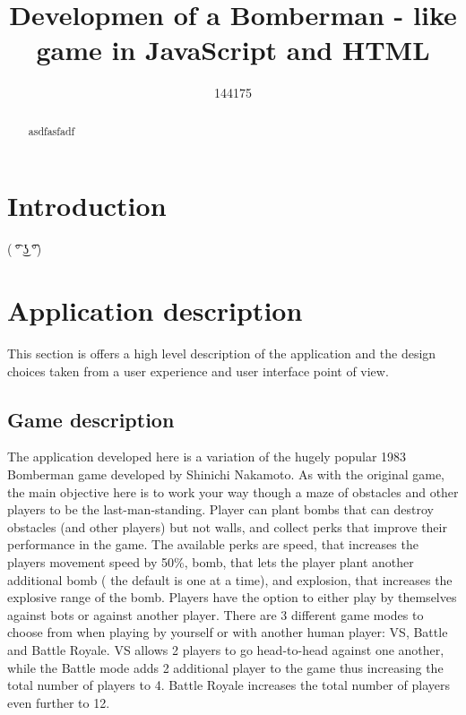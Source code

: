\documentclass[]{article}
\title{Developmen of a Bomberman - like game in JavaScript and HTML}
\author{144175}
\begin{document}
\maketitle

\begin{abstract}
asdfasfadf
\end{abstract}

\section{Introduction}
( ͡° ͜ʖ ͡°)
\section{Application description}
This section is offers a high level description of the application and the design choices taken from a user experience and user interface point of view.
\subsection{Game description}
The application developed here is a variation of the hugely popular 1983 Bomberman game developed by Shinichi Nakamoto. As with the original game, the main objective here is to work your way though a maze of obstacles and other players to be the last-man-standing. Player can plant bombs that can destroy obstacles (and other players) but not walls, and collect perks that improve their performance in the game. The available perks are speed, that increases the players movement speed by 50\%, bomb, that lets the player plant another additional bomb ( the default is one at a time), and explosion, that increases the explosive range of the bomb. Players have the option to either play by themselves against bots or against another player. There are 3 different game modes to choose from when playing by yourself or with another human player: VS, Battle and Battle Royale. VS allows 2 players to go head-to-head against one another, while the Battle mode adds 2 additional player to the game thus increasing the total number of players to 4. Battle Royale increases the total number of players even further to 12.
\subsection{}
\end{document}

